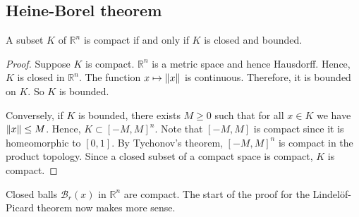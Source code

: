 \subsection{Heine-Borel theorem}
\begin{theorem}
	A subset \( K \) of \( \mathbb R^n \) is compact if and only if \( K \) is closed and bounded.
\end{theorem}
\begin{proof}
	Suppose \( K \) is compact.
	\( \mathbb R^n \) is a metric space and hence Hausdorff.
	Hence, \( K \) is closed in \( \mathbb R^n \).
	The function \( x \mapsto \norm{x} \) is continuous.
	Therefore, it is bounded on \( K \).
	So \( K \) is bounded.

	Conversely, if \( K \) is bounded, there exists \( M \geq 0 \) such that for all \( x \in K \) we have \( \norm{x} \leq M \).
	Hence, \( K \subset [-M, M]^n \).
	Note that \( [-M, M] \) is compact since it is homeomorphic to \( [0,1] \).
	By Tychonov's theorem, \( [-M, M]^n \) is compact in the product topology.
	Since a closed subset of a compact space is compact, \( K \) is compact.
\end{proof}
\begin{example}
	Closed balls \( \mathcal B_r(x) \) in \( \mathbb R^n \) are compact.
	The start of the proof for the Lindel\"of-Picard theorem now makes more sense.
\end{example}

